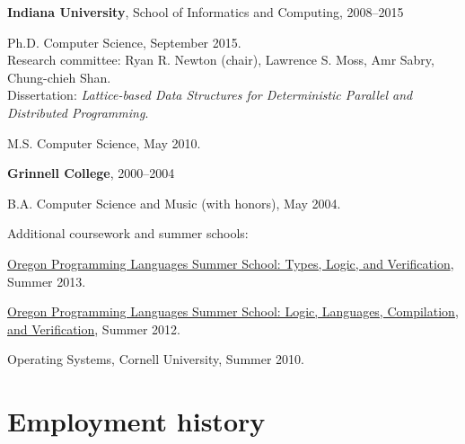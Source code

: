 \documentclass[10pt,letterpaper]{article}
\newenvironment{itemize*}
  {\begin{itemize}
      \setlength{\itemsep}{1pt}
      \setlength{\parskip}{3pt}
  }
  {\end{itemize}}
\begin{document}
\begin{itemize*}
\item
\textbf{Indiana University}, School of Informatics and Computing, 2008--2015
\begin{itemize*}
\item Ph.D. Computer Science, September 2015. \\
      Research committee: Ryan R. Newton (chair), Lawrence S. Moss,
      Amr Sabry, Chung-chieh Shan. \\
      Dissertation: \emph{Lattice-based Data Structures for
        Deterministic Parallel and Distributed Programming}.

\item M.S. Computer Science, May 2010.
\end{itemize*}

\item
\textbf{Grinnell College}, 2000--2004
\begin{itemize*}
\item B.A. Computer Science and Music (with honors), May 2004.
\end{itemize*}

\item Additional coursework and summer schools:
\begin{itemize*}
\item
  \href{http://www.cs.uoregon.edu/research/summerschool/summer13/}{Oregon
    Programming Languages Summer School: Types, Logic, and
    Verification}, Summer 2013.
\item
  \href{http://www.cs.uoregon.edu/research/summerschool/summer12/}{Oregon
    Programming Languages Summer School: Logic, Languages,
    Compilation, and Verification}, Summer 2012.
\item Operating Systems, Cornell University, Summer 2010.
\end{itemize*}

\end{itemize*}

\section*{Employment history}
\end{document}
